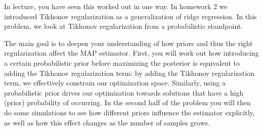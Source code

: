 \documentclass[preview]{standalone}
\begin{document}
In lecture, you have seen this worked out in one way. In homework 2 we
introduced Tikhonov regularization as a generalization of ridge
regression. In this problem, we look at Tikhonov regularization from a
probabilistic standpoint.

The main goal is to deepen your understanding of how priors and thus
the right regularization affect the MAP estimator. First, you will
work out how introducing a certain probabilistic prior before
maximizing the posterior is equivalent to adding the Tikhonov
regularization term: by adding the Tikhonov regularization term, we
effectively constrain our optimization space.  Similarly, using a
probabilistic prior drives our optimization towards solutions that
have a high (prior) probability of occurring. In the second half of
the problem you will then do some simulations to see how different
priors influence the estimator explicitly, as well as how this
effect changes as the number of samples grows.
\end{document}
